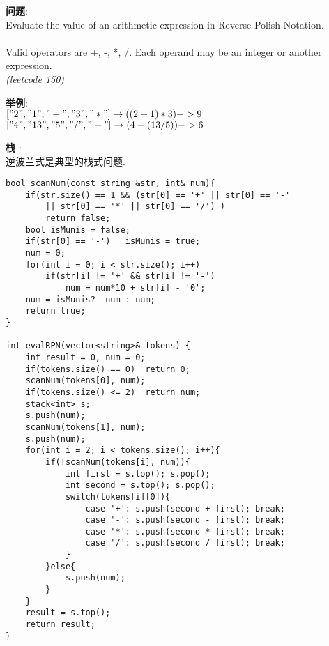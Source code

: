     
\begin{description}
    \item{\textbf{问题}}:\\
Evaluate the value of an arithmetic expression in Reverse Polish Notation.\\
\\
Valid operators are +, -, *, /. Each operand may be an integer or another expression.\\
\textit{(leetcode 150)}
    \item{\textbf{举例}}:\\
  $["2", "1", "+", "3", "*"] \rightarrow ((2 + 1) * 3) -> 9$
  $["4", "13", "5", "/", "+"] \rightarrow (4 + (13 / 5)) -> 6$
    \item{\textbf{栈}} : 
    \\逆波兰式是典型的栈式问题.
    \begin{lstlisting}
bool scanNum(const string &str, int& num){
	if(str.size() == 1 && (str[0] == '+' || str[0] == '-' 
		|| str[0] == '*' || str[0] == '/') )
		return false;
	bool isMunis = false;
	if(str[0] == '-')	isMunis = true;
	num = 0;
	for(int i = 0; i < str.size(); i++)
		if(str[i] != '+' && str[i] != '-')
			num = num*10 + str[i] - '0';
	num = isMunis? -num : num;
	return true;
}

int evalRPN(vector<string>& tokens) {
	int result = 0, num = 0;
	if(tokens.size() == 0)	return 0;
	scanNum(tokens[0], num);
	if(tokens.size() <= 2)	return num;
	stack<int> s;
	s.push(num);
	scanNum(tokens[1], num);
	s.push(num);
	for(int i = 2; i < tokens.size(); i++){
		if(!scanNum(tokens[i], num)){
			int first = s.top(); s.pop();
			int second = s.top(); s.pop();
			switch(tokens[i][0]){
				case '+': s.push(second + first); break;
				case '-': s.push(second - first); break;
				case '*': s.push(second * first); break;
				case '/': s.push(second / first); break;
			}
		}else{
			s.push(num);
		}
	}
	result = s.top();
	return result;
}
    \end{lstlisting}
\end{description}
